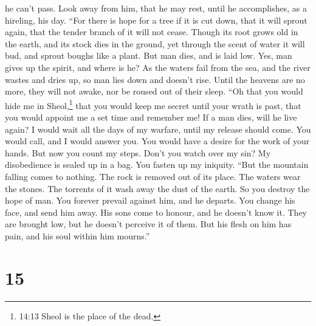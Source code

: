 he can't pass.  Look away from him, that he may rest, until
he accomplishes, as a hireling, his day.  ``For there is
hope for a tree if it is cut down, that it will sprout again, that the
tender branch of it will not cease.  Though its root grows
old in the earth, and its stock dies in the ground,  yet
through the scent of water it will bud, and sprout boughs like a plant.
 But man dies, and is laid low. Yes, man gives up the
spirit, and where is he?  As the waters fail from the sea,
and the river wastes and dries up,  so man lies down and
doesn't rise. Until the heavens are no more, they will not awake, nor be
roused out of their sleep.  ``Oh that you would hide me in
Sheol,\footnote{14:13 Sheol is the place of the dead.} that you would
keep me secret until your wrath is past, that you would appoint me a set
time and remember me!  If a man dies, will he live again? I
would wait all the days of my warfare, until my release should come.
 You would call, and I would answer you. You would have a
desire for the work of your hands.  But now you count my
steps. Don't you watch over my sin?  My disobedience is
sealed up in a bag. You fasten up my iniquity.  ``But the
mountain falling comes to nothing. The rock is removed out of its place.
 The waters wear the stones. The torrents of it wash away
the dust of the earth. So you destroy the hope of man.  You
forever prevail against him, and he departs. You change his face, and
send him away.  His sons come to honour, and he doesn't
know it. They are brought low, but he doesn't perceive it of them.
 But his flesh on him has pain, and his soul within him
mourns.''

\hypertarget{section-11}{%
\section{15}\label{section-11}}

